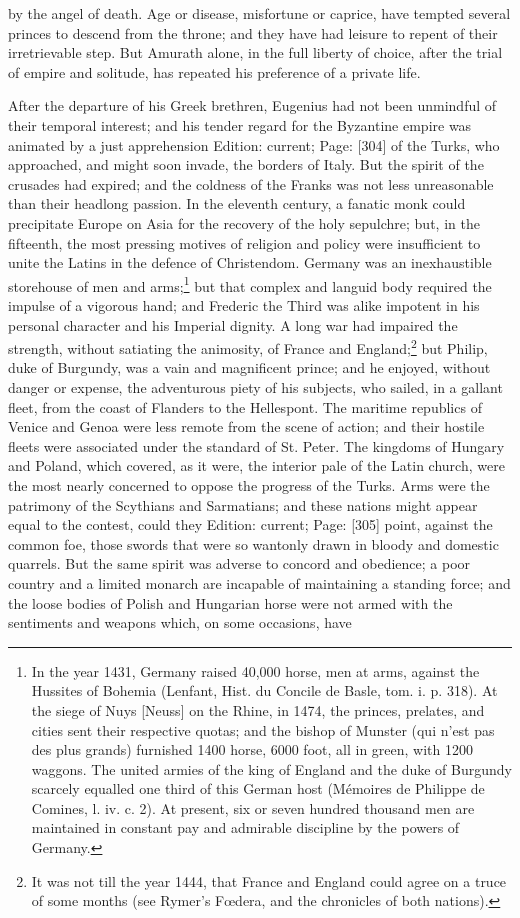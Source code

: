 by the angel of death. Age or disease, misfortune or caprice, have tempted several princes to descend from the throne; and they have had leisure to repent of their irretrievable step. But Amurath alone, in the full liberty of choice, after the trial of empire and solitude, has repeated his preference of a private life.

After the departure of his Greek brethren, Eugenius had not been unmindful of their temporal interest; and his tender regard for the Byzantine empire was animated by a just apprehension Edition: current; Page: [304] of the Turks, who approached, and might soon invade, the borders of Italy. But the spirit of the crusades had expired; and the coldness of the Franks was not less unreasonable than their headlong passion. In the eleventh century, a fanatic monk could precipitate Europe on Asia for the recovery of the holy sepulchre; but, in the fifteenth, the most pressing motives of religion and policy were insufficient to unite the Latins in the defence of Christendom. Germany was an inexhaustible storehouse of men and arms;\footnote{In the year 1431, Germany raised 40,000 horse, men at arms, against the Hussites of Bohemia (Lenfant, Hist. du Concile de Basle, tom. i. p. 318). At the siege of Nuys [Neuss] on the Rhine, in 1474, the princes, prelates, and cities sent their respective quotas; and the bishop of Munster (qui n\texthebrew{}’est pas des plus grands) furnished 1400 horse, 6000 foot, all in green, with 1200 waggons. The united armies of the king of England and the duke of Burgundy scarcely equalled one third of this German host (Mémoires de Philippe de Comines, l. iv. c. 2). At present, six or seven hundred thousand men are maintained in constant pay and admirable discipline by the powers of Germany.} but that complex and languid body required the impulse of a vigorous hand; and Frederic the Third was alike impotent in his personal character and his Imperial dignity. A long war had impaired the strength, without satiating the animosity, of France and England;\footnote{It was not till the year 1444, that France and England could agree on a truce of some months (see Rymer\texthebrew{}’s Fœdera, and the chronicles of both nations).} but Philip, duke of Burgundy, was a vain and magnificent prince; and he enjoyed, without danger or expense, the adventurous piety of his subjects, who sailed, in a gallant fleet, from the coast of Flanders to the Hellespont. The maritime republics of Venice and Genoa were less remote from the scene of action; and their hostile fleets were associated under the standard of St. Peter. The kingdoms of Hungary and Poland, which covered, as it were, the interior pale of the Latin church, were the most nearly concerned to oppose the progress of the Turks. Arms were the patrimony of the Scythians and Sarmatians; and these nations might appear equal to the contest, could they Edition: current; Page: [305] point, against the common foe, those swords that were so wantonly drawn in bloody and domestic quarrels. But the same spirit was adverse to concord and obedience; a poor country and a limited monarch are incapable of maintaining a standing force; and the loose bodies of Polish and Hungarian horse were not armed with the sentiments and weapons which, on some occasions, have 